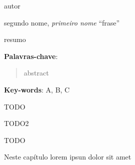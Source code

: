 \documentclass[tcc]{ic}
\begin{document}

\capa

\begin{agradecimentos}




\vspace{2em}
\begin{flushright}
autor
\end{flushright}


\vspace{30em}
\begin{epigraph}{segundo nome, \textit{primeiro nome}}
``frase''
\end{epigraph}



\end{agradecimentos}

\begin{resumo}

resumo

\vspace{1em}
\textbf{Palavras-chave}: 
\end{resumo}

\begin{abstract}
abstract

\end{abstract}
\vspace{1em}
\textbf{Key-words}:  A, B, C


\makefigurespage

\listoftables

\listofalgorithms

\makeabrevpage{}

\makesymbolspage{}

\tableofcontents

\inicio




TODO

TODO2

TODO

Neste capítulo lorem ipsun dolor sit amet


% 
\begin{raggedright}

\renewcommand{\bibsection}{
\chapter*{\begin{flushright}Referências bibliográficas\end{flushright}}
\addcontentsline{toc}{chapter}{Referências bibliográficas}
}

\newpage\lhead{\rightmark}
\end{raggedright}
\end{document}
